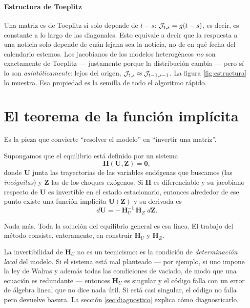 \paragraph{Estructura de Toeplitz} Una matriz es de Toeplitz si solo depende de
$t-s$: $\mathcal{J}_{t,s} = g(t-s)$, es decir, es constante a lo largo de las diagonales.
Esto equivale a decir que la respuesta a una noticia solo depende de cuán lejana
sea la noticia, no de en qué fecha del calendario estemos. Los jacobianos de los
modelos heterogéneos \emph{no} son exactamente de Toeplitz --- justamente porque
la distribución cambia --- pero sí lo son \emph{asintóticamente}: lejos del
origen, $\mathcal{J}_{t,s}\approx \mathcal{J}_{t-1,s-1}$. La figura
\ref{fig:estructura} lo muestra. Esa propiedad es la semilla de todo el
algoritmo rápido.

\section{El teorema de la función implícita}

Es la pieza que convierte ``resolver el modelo'' en ``invertir una matriz''.

Supongamos que el equilibrio está definido por un sistema
\begin{equation}
\mathbf{H}(\mathbf{U}, \mathbf{Z}) = \mathbf{0},
\end{equation}
donde $\mathbf{U}$ junta las trayectorias de las variables endógenas que
buscamos (las \emph{incógnitas}) y $\mathbf{Z}$ las de los choques exógenos. Si
$\mathbf{H}$ es diferenciable y su jacobiano respecto de $\mathbf{U}$ es
invertible en el estado estacionario, entonces alrededor de ese punto existe una
función implícita $\mathbf{U}(\mathbf{Z})$ y su derivada es
\begin{equation}
d\mathbf{U} = -\,\mathbf{H}_U^{-1}\,\mathbf{H}_Z\; d\mathbf{Z}.
\label{eq:ift}
\end{equation}

Nada más. Toda la solución del equilibrio general es esa línea. El trabajo del
método consiste, enteramente, en construir $\mathbf{H}_U$ y $\mathbf{H}_Z$.

\begin{trampa}
La invertibilidad de $\mathbf{H}_U$ no es un tecnicismo: es la condición de
\emph{determinación local} del modelo. Si el sistema está mal planteado --- por
ejemplo, si uno impone la ley de Walras y además todas las condiciones de
vaciado, de modo que una ecuación es redundante --- entonces $\mathbf{H}_U$ es
singular y el código falla con un error de álgebra lineal que no dice nada útil.
Si está casi singular, el código no falla pero devuelve basura. La sección
\ref{sec:diagnostico} explica cómo diagnosticarlo.
\end{trampa}

